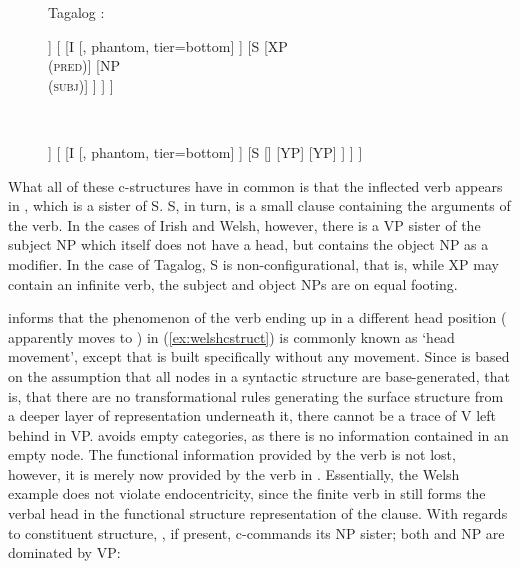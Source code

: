 \begin{figure}
\a Tagalog \citep[131]{kroeger1991}:\label{ex:tagalogcstruct}\medskip \\
\begin{minipage}[t]{.5\remaining}
\begin{forest}
[IP
	[SPEC
		[, phantom, tier=bottom]
	]
	[
		[I
			[, phantom, tier=bottom]
		]
		[S
			[{XP\\ (\textsc{pred})}]
			[{NP\\ (\textsc{subj})}]
		]
	]
]
\end{forest}
\end{minipage}
~
\begin{minipage}[t]{.5\remaining}
\begin{forest}
[IP
	[SPEC
		[, phantom, tier=bottom]
	]
	[
		[I
			[, phantom, tier=bottom]
		]
		[S
			[]
			[YP]
			[YP]
		]
	]
]
\end{forest}
\end{minipage}
\xe
\end{figure}

What all of these c-structures have in common is that the inflected verb
appears in , which is a sister of S. S, in turn, is a small clause
containing the arguments of the verb. In the cases of Irish and Welsh, however,
there is a VP sister of the subject NP which itself does not have a head, but
contains the object NP as a modifier. In the case of Tagalog, S is
non-configurational, that is, while XP may contain an infinite verb, the
subject and object NPs are on equal footing.

\citet[129--138]{bresnan2016} informs that the phenomenon of the verb ending up
in a different head position ( apparently moves to ) in
(\ref{ex:welshcstruct}) is commonly known as `head movement', except that
\Lfg{} is built specifically without any movement. Since \Lfg{} is based
on the assumption that all nodes in a syntactic structure are base-generated,
that is, that there are no transformational rules generating the surface
structure from a deeper layer of representation underneath it, there cannot be
a trace of V left behind in VP. \Lfg{} avoids empty categories, as there is no
information contained in an empty node. The functional information provided by
the verb is not lost, however, it is merely now provided by the verb in
. Essentially, the Welsh example does not violate endocentricity,
since the finite verb in  still forms the verbal head in the
functional structure representation of the clause. With regards to constituent
structure, , if present, c-commands its NP sister; both  and
NP are dominated by VP:

